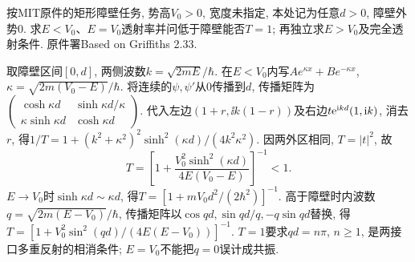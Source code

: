 \begin{exercise}
按MIT原件的矩形障壁任务, 势高$V_0>0$, 宽度未指定, 本处记为任意$d>0$, 障壁外势0. 求$E<V_0$、$E=V_0$透射率并问低于障壁能否$T=1$; 再独立求$E>V_0$及完全透射条件. 原件署Based on Griffiths 2.33.
\end{exercise}
\begin{solution}
取障壁区间$[0,d]$, 两侧波数$k=\sqrt{2mE}/\hbar$. 在$E<V_0$内写$Ae^{\kappa x}+Be^{-\kappa x}$, $\kappa=\sqrt{2m(V_0-E)}/\hbar$. 将连续的$\psi,\psi'$从0传播到$d$, 传播矩阵为$\left(\begin{smallmatrix}\cosh\kappa d&\sinh\kappa d/\kappa\\\kappa\sinh\kappa d&\cosh\kappa d\end{smallmatrix}\right)$. 代入左边$(1+r,\ii k(1-r))$及右边$t\mathrm e^{\mathrm i kd}(1,\mathrm i k)$, 消去$r$, 得$1/T=1+(k^2+\kappa^2)^2\sinh^2(\kappa d)/(4k^2\kappa^2)$. 因两外区相同, $T=|t|^2$, 故
\[
T=\left[1+\frac{V_0^2\sinh^2(\kappa d)}{4E(V_0-E)}\right]^{-1}<1.
\]
$E\to V_0$时$\sinh\kappa d\sim\kappa d$, 得$T=[1+mV_0d^2/(2\hbar^2)]^{-1}$. 高于障壁时内波数$q=\sqrt{2m(E-V_0)}/\hbar$, 传播矩阵以$\cos qd,\sin qd/q,-q\sin qd$替换, 得$T=[1+V_0^2\sin^2(qd)/(4E(E-V_0))]^{-1}$. $T=1$要求$qd=n\pi$, $n\ge1$, 是两接口多重反射的相消条件; $E=V_0$不能把$q=0$误计成共振.
\end{solution}
